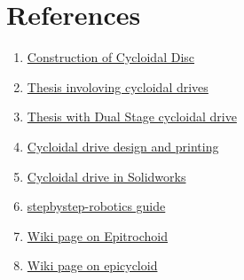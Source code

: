\documentclass{article}
\begin{document}
\section{References}

\begin{enumerate}
    \item  \href{https://www.tec-science.com/mechanical-power-transmission/planetary-gear/construction-of-the-cycloidal-disc/}{Construction of Cycloidal Disc}
    \item  \href{https://digitalcommons.njit.edu/cgi/viewcontent.cgi?article=2822&context=theses}{Thesis involoving cycloidal drives}
    \item \href{https://www.researchgate.net/publication/235992854_A_New_Design_of_a_Two-Stage_Cycloidal_Speed_Reducer}{Thesis with Dual Stage cycloidal drive}
    \item  \href{https://howtomechatronics.com/how-it-works/what-is-cycloidal-driver-designing-3d-printing-and-testing/}{Cycloidal drive design and printing}
    \item  \href{https://blogs.solidworks.com/teacher/wp-content/uploads/sites/3/Building-a-Cycloidal-Drive-with-SOLIDWORKS.pdf}{Cycloidal drive in Solidworks}
    \item \href{https://stepbystep-robotics.com/hp/robots/cycloidal-drive/}{stepbystep-robotics guide}
    \item  \href{https://en.wikipedia.org/wiki/Epitrochoid}{Wiki page on Epitrochoid}
    \item  \href{https://en.wikipedia.org/wiki/Epicycloid}{Wiki page on epicycloid}
\end{enumerate}
\end{document}
